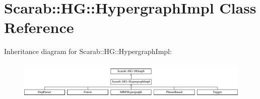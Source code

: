 \hypertarget{classScarab_1_1HG_1_1HypergraphImpl}{
\section{Scarab::HG::HypergraphImpl Class Reference}
\label{classScarab_1_1HG_1_1HypergraphImpl}
}
Inheritance diagram for Scarab::HG::HypergraphImpl:\begin{figure}[H]
\begin{center}
\leavevmode
\includegraphics[height=1.85635cm]{classScarab_1_1HG_1_1HypergraphImpl}
\end{center}
\end{figure}
